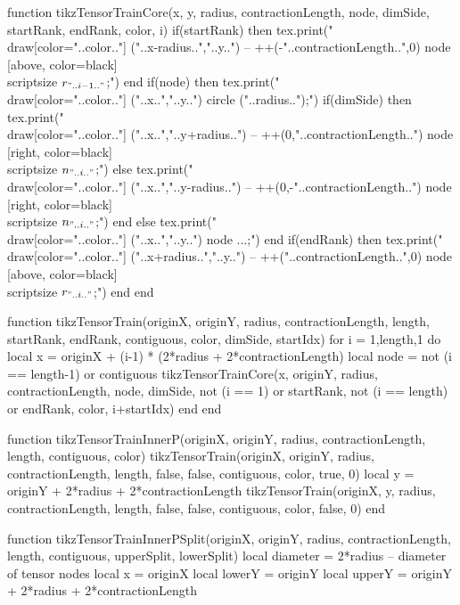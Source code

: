 \begin{luacode*}
function tikzTensorTrainCore(x, y, radius, contractionLength, node, dimSide, startRank, endRank, color, i)
	 if(startRank) then
			tex.print("\\draw[color="..color.."] ("..x-radius..","..y..") -- ++(-"..contractionLength..",0) node [above, color=black] {\\scriptsize $r_{".. i-1 .."}$};")
	 end
	 if(node) then
			tex.print("\\draw[color="..color.."] ("..x..","..y..") circle ("..radius..");")
			if(dimSide) then
				 tex.print("\\draw[color="..color.."] ("..x..","..y+radius..") -- ++(0,"..contractionLength..") node [right, color=black] {\\scriptsize $n_{"..i.."}$};")
			else
				 tex.print("\\draw[color="..color.."] ("..x..","..y-radius..") -- ++(0,-"..contractionLength..") node [right, color=black] {\\scriptsize $n_{"..i.."}$};")
			end
	 else
			tex.print("\\draw[color="..color.."] ("..x..","..y..") node {...};")
	 end
	 if(endRank) then
			tex.print("\\draw[color="..color.."] ("..x+radius..","..y..") -- ++("..contractionLength..",0) node [above, color=black] {\\scriptsize $r_{"..i.."}$};")
	 end
end

function tikzTensorTrain(originX, originY, radius, contractionLength, length, startRank, endRank, contiguous, color, dimSide, startIdx)
	 for i = 1,length,1 do
			local x = originX + (i-1) * (2*radius + 2*contractionLength)
			local node = not (i == length-1) or contiguous
			tikzTensorTrainCore(x, originY, radius, contractionLength, node, dimSide, not (i == 1) or startRank, not (i == length) or endRank, color, i+startIdx)
	 end
end

function tikzTensorTrainInnerP(originX, originY, radius, contractionLength, length, contiguous, color)
	 tikzTensorTrain(originX, originY, radius, contractionLength, length, false, false, contiguous, color, true, 0)
	 local y = originY + 2*radius + 2*contractionLength
	 tikzTensorTrain(originX, y, radius, contractionLength, length, false, false, contiguous, color, false, 0)
end

function tikzTensorTrainInnerPSplit(originX, originY, radius, contractionLength, length, contiguous, upperSplit, lowerSplit)
	 local diameter = 2*radius         -- diameter of tensor nodes
	 local x = originX
	 local lowerY = originY
	 local upperY = originY + 2*radius + 2*contractionLength


\end{luacode*}

